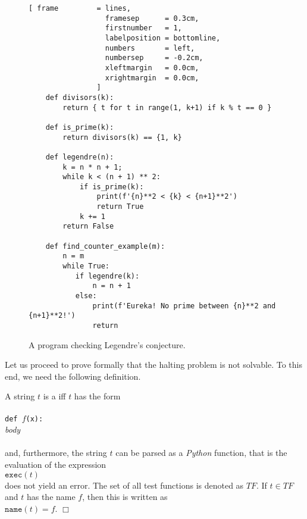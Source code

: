\begin{figure}[!ht]
\centering
\begin{Verbatim}[ frame         = lines, 
                  framesep      = 0.3cm, 
                  firstnumber   = 1,
                  labelposition = bottomline,
                  numbers       = left,
                  numbersep     = -0.2cm,
                  xleftmargin   = 0.0cm,
                  xrightmargin  = 0.0cm,
                ]
    def divisors(k):
        return { t for t in range(1, k+1) if k % t == 0 }

    def is_prime(k):
        return divisors(k) == {1, k}    
    
    def legendre(n):
        k = n * n + 1;
        while k < (n + 1) ** 2:
            if is_prime(k):
                print(f'{n}**2 < {k} < {n+1}**2')
                return True
            k += 1
        return False

    def find_counter_example(m):
        n = m
        while True:
           if legendre(k):
               n = n + 1
           else:
               print(f'Eureka! No prime between {n}**2 and {n+1}**2!')
               return
\end{Verbatim}
\vspace*{-0.3cm}
\caption{A program checking Legendre's conjecture.}
\label{fig:legendre.stlx}
\end{figure}

Let us proceed to prove formally that the halting problem is not solvable.  To this end, we need the
following definition.

\begin{Definition} 
A string $t$ is a  iff $t$ has the form \\[0.2cm]
\hspace*{1.3cm} \texttt{}         \\
\hspace*{1.3cm} \texttt{def $f$(x):} \\
\hspace*{1.8cm} \textsl{body}        \\
\hspace*{1.3cm} \texttt{}         \\[0.2cm]
and, furthermore, the string $t$ can be parsed as a \textsl{Python} function, that is the evaluation of
the expression
\\[0.2cm]
\hspace*{1.3cm}
$\texttt{exec}(t)$
\\[0.2cm]
does not yield an error.  
The set of all test functions is denoted as $T\!F$.  If $t \in T\!F$ and $t$ has the name $f$, then
this is written as 
\\[0.2cm]
\hspace*{1.3cm}
$\mathtt{name}(t) = f$. \hspace*{\fill} $\Box$
\end{Definition}

